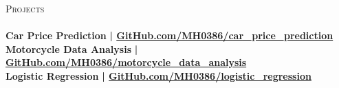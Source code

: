 \documentclass[a4paper]{article}
\newcommand{\lineunder} {
    \vspace*{-8pt} \\
    \hspace*{-18pt} \hrulefill \\
}
\newcommand{\header} [1] {
    {\hspace*{-18pt}\vspace*{6pt} \textsc{#1}}
    \vspace*{-6pt} \lineunder
}
\begin{document}
      \header{Projects}
\vspace{2mm}
      {\textbf{Car Price Prediction}}\textbf{ | \href{https://github.com/MH0386/car\_price\_prediction}{GitHub.com/MH0386/car\_price\_prediction}}\\

\vspace*{1mm}
      {\textbf{Motorcycle Data Analysis}}\textbf{ | \href{https://github.com/MH0386/motorcycle\_data\_analysis}{GitHub.com/MH0386/motorcycle\_data\_analysis}}\\

\vspace*{1mm}
      {\textbf{Logistic Regression}}\textbf{ | \href{https://github.com/MH0386/logistic\_regression}{GitHub.com/MH0386/logistic\_regression}}\\

\vspace*{2mm}
\end{document}

